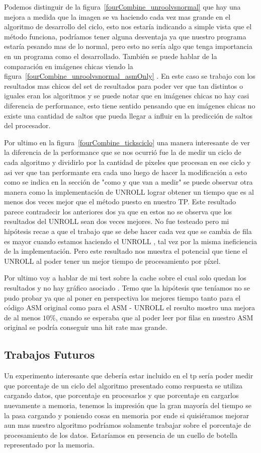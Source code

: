 Podemos distinguir de la figura~\ref{fourCombine_unroolvsnormal} que hay una mejora a medida que la imagen se va haciendo cada vez mas grande en el algoritmo de desarrollo del ciclo, esto nos estaría indicando a simple vista que el método funciona, podríamos tener alguna desventaja ya que nuestro programa estaría pesando mas de lo normal, pero esto no sería algo que tenga importancia en un programa como el desarrollado. También se puede hablar de la comparación en imágenes chicas viendo la figura~\ref{fourCombine_unroolvsnormal_asmOnly} . En este caso se trabajo con los resultados mas chicos del set de resultados para poder ver que tan distintos o iguales eran los algoritmos y se puede notar que en imágenes chicas no hay casi diferencia de performance, esto tiene sentido pensando que en imágenes chicas no existe una cantidad de saltos que pueda llegar a influir en la predicción de saltos del procesador.

Por ultimo en la figura~\ref{fourCombine_ticksciclo} una manera interesante de ver la diferencia de la performance que se nos ocurrió fue la de medir un ciclo de cada algoritmo y dividirlo por la cantidad de pixeles que procesan en ese ciclo y asi ver que tan performante era cada uno luego de hacer la modificación a esto como se indica en la sección de "como y que van a medir" se puede observar otra manera como la implementación de UNROLL lograr obtener un tiempo que es al menos dos veces mejor que el método puesto en nuestro TP. Este resultado parece contradecir los anteriores dos ya que en estos no se observa que los resultados del UNROLL sean dos veces mejores. No fue testeado pero mi hipótesis recae a que el trabajo que se debe hacer cada vez que se cambia de fila es mayor cuando estamos haciendo el UNROLL , tal vez por la misma ineficiencia de la implementación. Pero este resultado nos muestra el potencial que tiene el UNROLL al poder tener un mejor tiempo de procesamiento por píxel.

Por ultimo voy a hablar de mi test sobre la cache sobre el cual solo quedan los resultados y no hay gráfico asociado . Temo que la  hipótesis que teníamos no se pudo probar ya que al poner en perspectiva los mejores tiempo tanto para el código ASM original como para el ASM - UNROLL el resulto mostro una mejora de al menos $10\%$, cuando se esperaba que al poder leer por filas en nuestro ASM original se podría conseguir una hit rate mas grande. 

\subsection{Trabajos Futuros}
Un experimento interesante que debería estar incluido en el tp sería poder medir que porcentaje de un ciclo del algoritmo presentado como respuesta se utiliza cargando datos, que porcentaje en procesarlos y que porcentaje en cargarlos nuevamente a memoria, tenemos la impresión que la gran mayoría del tiempo se la pasa cargando y poniendo cosas en memoria por ende si quisiéramos mejorar aun mas nuestro algoritmo podríamos solamente trabajar sobre el porcentaje de procesamiento de los datos. Estaríamos en presencia de un cuello de botella representado por la memoria.
